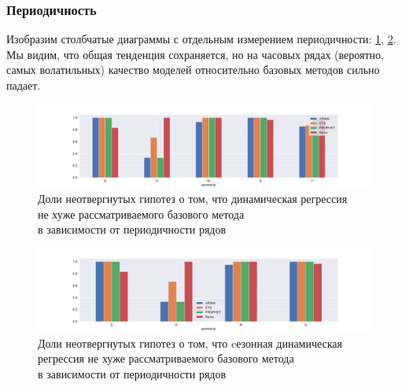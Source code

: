 \documentclass[a4paper,14pt]{extarticle}
\begin{document}
	\subsubsection{Периодичность}
	Изобразим столбчатые диаграммы с отдельным измерением периодичности: \ref{results:dynreg:periodicity}, \ref{results:seasdynreg:periodicity}. Мы видим, что общая тенденция сохраняется, но на часовых рядах (вероятно, самых волатильных) качество моделей относительно базовых методов сильно падает. 
	\begin{figure}[!h]
		\captionsetup{justification=centering}
		\centering
		\includegraphics[width=\linewidth]{pictures/results-dynreg-periodicity.pdf}
		\caption{Доли неотвергнутых гипотез о том, что динамическая регрессия \\ не хуже рассматриваемого базового метода \\ в зависимости от периодичности рядов}
		\label{results:dynreg:periodicity}
	\end{figure}
	\begin{figure}[!h]
		\captionsetup{justification=centering}
		\centering
		\includegraphics[width=\linewidth]{pictures/results-seasdynreg-periodicity.pdf}
		\caption{Доли неотвергнутых гипотез о том, что cезонная динамическая регрессия не хуже рассматриваемого базового метода \\ в зависимости от периодичности рядов}
		\label{results:seasdynreg:periodicity}
	\end{figure}
\end{document}
